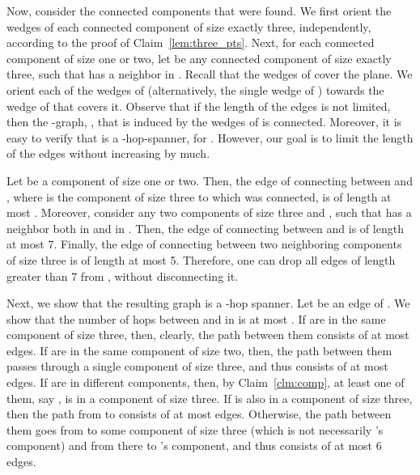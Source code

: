 \documentclass[11pt]{article}
\newtheorem{claim}[theorem]{Claim}
\newcommand{\old}[1]{{{}}}
\begin{document}
Now, consider the connected components that were found. We first orient the wedges of each connected component of size exactly three, independently, according to the proof of Claim~\ref{lem:three_pts}. Next, for each connected component  of size one or two, let  be any connected component of size exactly three, such that  has a neighbor in . Recall that the wedges of  cover the plane. We orient each of the wedges of  (alternatively, the single wedge of ) towards the wedge of  that covers it. 
Observe that if the length of the edges is not limited, then the -graph, , that is induced by the wedges of  is connected. Moreover, it is easy to verify that  is a -hop-spanner, for . However, our goal is to limit the length of the edges without increasing  by much. 

Let  be a component of size one or two.
Then, the edge of  connecting between  and , where  is the component of size three to which  was connected, is of length at most . Moreover, consider any two components of size three  and , such that  has a neighbor both in  and in . Then, the edge of  connecting between  and  is of length at most 7. Finally, the edge of  connecting between two neighboring components of size three is of length at most 5. 
Therefore, one can drop all edges of length greater than 7 from , without disconnecting it. 

Next, we show that the resulting graph  is a -hop spanner.
Let  be an edge of . We show that the number of hops between  and  in  is at most . 
If  are in the same component of size three, then, clearly, the path between them consists of at most  edges. 
If  are in the same component of size two, then, the path between them passes through a single component of size three, and thus consists of at most  edges. 
If  are in different components, then, by Claim~\ref{clm:comp}, at least one of them, say , is in a component of size three. If  is also in a component of size three, then the path from  to  consists of at most  edges. Otherwise, the path between them goes from  to some component  of size three (which is not necessarily 's component) and from there to 's component, and thus consists of at most 6 edges. 


\old{
The following claim shows that the final graph  is a -hop-spanner, for . 
\begin{claim}\label{clm:hop-spanner}
 is a -hop spanner.
\end{claim}
\begin{proof}
Let  be an edge of . We show that the number of hops between  and  in  is at most . 
If  are in the same component of size three, then, clearly, the path between them consists of at most  edges. 
If  are in the same component of size two, then, the path between them passes through a single component of size three, and thus consists of at most  edges. 
If  are in different components, then, by Claim~\ref{clm:comp}, at least one of them, say , is in a component of size three. If  is also in a component of size three, then the path from  to  consists of at most  edges. Otherwise, the path between them goes from  to some component  of size three (which is not necessarily 's component) and from there to 's component, and thus consists of at most 6 edges.
\end{proof}
}
\end{document}
